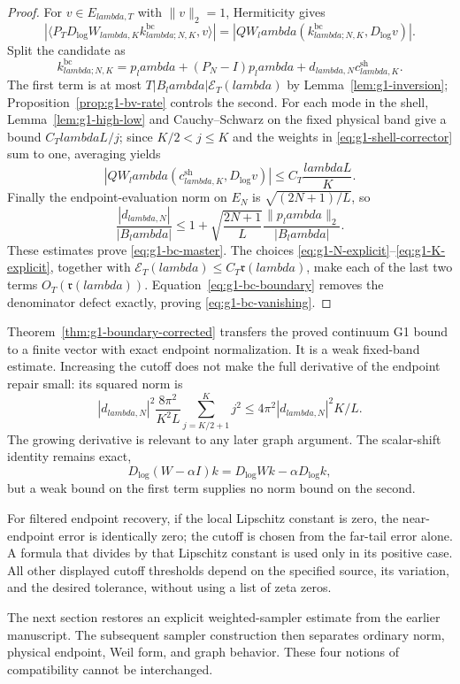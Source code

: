\documentclass[11pt]{article}
\def\lambda{lambda}%
\theoremstyle{remark}
\begin{document}
\begin{proof}
For $v\in E_{\lambda,T}$ with $\|v\|_2=1$, Hermiticity gives
\[
 |\langle P_TD_{\log}W_{\lambda,K}
 k^{\mathrm{bc}}_{\lambda;N,K},v\rangle|
 =|QW_\lambda(k^{\mathrm{bc}}_{\lambda;N,K},D_{\log}v)|.
\]
Split the candidate as
\[
 k^{\mathrm{bc}}_{\lambda;N,K}
 =p_\lambda+(P_N-I)p_\lambda+d_{\lambda,N}c^{\mathrm{sh}}_{\lambda,K}.
\]
The first term is at most $T|B_\lambda|\mathcal E_T(\lambda)$ by
Lemma~\ref{lem:g1-inversion}; Proposition~\ref{prop:g1-bv-rate} controls the
second.  For each mode in the shell, Lemma~\ref{lem:g1-high-low} and
Cauchy--Schwarz on the fixed physical band give a bound
$C_T\lambda L/j$; since $K/2<j\le K$ and the weights in
\eqref{eq:g1-shell-corrector} sum to one, averaging yields
\[
 |QW_\lambda(c^{\mathrm{sh}}_{\lambda,K},D_{\log}v)|
 \le C_T\frac{\lambda L}{K}.
\]
Finally the endpoint-evaluation norm on $E_N$ is
$\sqrt{(2N+1)/L}$, so
\[
 \frac{|d_{\lambda,N}|}{|B_\lambda|}
 \le1+\sqrt{\frac{2N+1}{L}}
       \frac{\|p_\lambda\|_2}{|B_\lambda|}.
\]
These estimates prove \eqref{eq:g1-bc-master}.  The choices
\eqref{eq:g1-N-explicit}--\eqref{eq:g1-K-explicit}, together with
$\mathcal E_T(\lambda)\le C_T\mathfrak r(\lambda)$, make each of the last two
terms $O_T(\mathfrak r(\lambda))$.  Equation~\eqref{eq:g1-bc-boundary} removes
the denominator defect exactly, proving \eqref{eq:g1-bc-vanishing}.
\end{proof}

Theorem~\ref{thm:g1-boundary-corrected} transfers the proved continuum G1
bound to a finite vector with exact endpoint normalization. It is a weak
fixed-band estimate. Increasing the cutoff does not make the full
derivative of the endpoint repair small: its squared norm is
\[
 |d_{\lambda,N}|^2\frac{8\pi^2}{K^2L}
 \sum_{j=K/2+1}^{K}j^2\le
 4\pi^2|d_{\lambda,N}|^2K/L.
\]
The growing derivative is relevant to any later graph argument.
The scalar-shift identity remains exact,
\[
 D_{\log}(W-\alpha I)k=D_{\log}Wk-\alpha D_{\log}k,
\]
but a weak bound on the first term supplies no norm bound on the second.

For filtered endpoint recovery, if the local Lipschitz constant is zero,
the near-endpoint error is identically zero; the cutoff is chosen from
the far-tail error alone. A formula that divides by that Lipschitz
constant is used only in its positive case. All other displayed cutoff
thresholds depend on the specified source, its variation, and the desired
tolerance, without using a list of zeta zeros.

The next section restores an explicit weighted-sampler estimate from the
earlier manuscript. The subsequent sampler construction then separates
ordinary norm, physical endpoint, Weil form, and graph behavior. These
four notions of compatibility cannot be interchanged.
\end{document}
